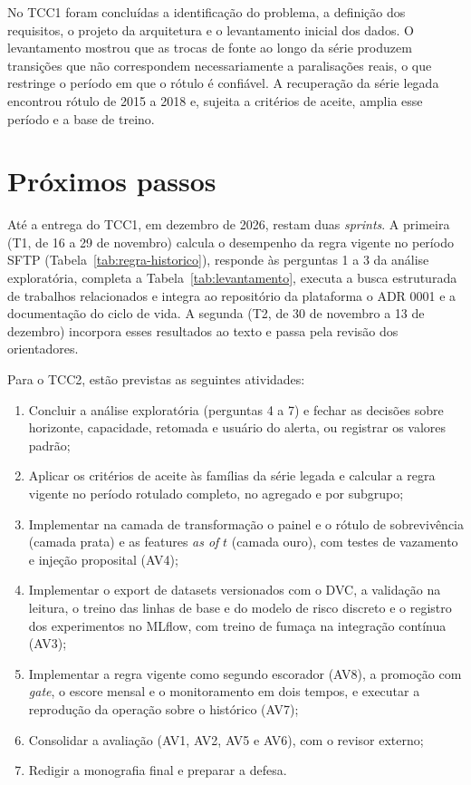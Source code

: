 No TCC1 foram concluídas a identificação do problema, a definição dos requisitos, o projeto da arquitetura e o levantamento inicial dos dados. O levantamento mostrou que as trocas de fonte ao longo da série produzem transições que não correspondem necessariamente a paralisações reais, o que restringe o período em que o rótulo é confiável. A recuperação da série legada encontrou rótulo de 2015 a 2018 e, sujeita a critérios de aceite, amplia esse período e a base de treino.

\section{Próximos passos}

Até a entrega do TCC1, em dezembro de 2026, restam duas \textit{sprints}. A primeira (T1, de 16 a 29 de novembro) calcula o desempenho da regra vigente no período SFTP (Tabela~\ref{tab:regra-historico}), responde às perguntas 1 a 3 da análise exploratória, completa a Tabela~\ref{tab:levantamento}, executa a busca estruturada de trabalhos relacionados e integra ao repositório da plataforma o ADR 0001 e a documentação do ciclo de vida. A segunda (T2, de 30 de novembro a 13 de dezembro) incorpora esses resultados ao texto e passa pela revisão dos orientadores.

Para o TCC2, estão previstas as seguintes atividades:

\begin{enumerate}
	\item[A1] Concluir a análise exploratória (perguntas 4 a 7) e fechar as decisões sobre horizonte, capacidade, retomada e usuário do alerta, ou registrar os valores padrão;
	\item[A2] Aplicar os critérios de aceite às famílias da série legada e calcular a regra vigente no período rotulado completo, no agregado e por subgrupo;
	\item[A3] Implementar na camada de transformação o painel e o rótulo de sobrevivência (camada prata) e as features \textit{as of} $t$ (camada ouro), com testes de vazamento e injeção proposital (AV4);
	\item[A4] Implementar o export de datasets versionados com o DVC, a validação na leitura, o treino das linhas de base e do modelo de risco discreto e o registro dos experimentos no MLflow, com treino de fumaça na integração contínua (AV3);
	\item[A5] Implementar a regra vigente como segundo escorador (AV8), a promoção com \textit{gate}, o escore mensal e o monitoramento em dois tempos, e executar a reprodução da operação sobre o histórico (AV7);
	\item[A6] Consolidar a avaliação (AV1, AV2, AV5 e AV6), com o revisor externo;
	\item[A7] Redigir a monografia final e preparar a defesa.
\end{enumerate}

